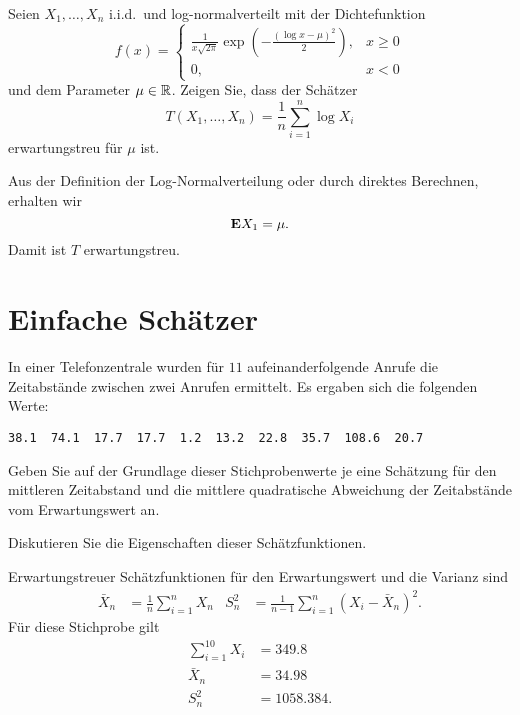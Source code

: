  Seien $X_1,\dots
,X_n$ i.i.d.\ und log-normalverteilt mit der Dichtefunktion
\begin{equation*}
    f(x) = \begin{cases}
        \frac{1}{ x\sqrt{2\pi} } \exp \left( - \frac{ (\log x - \mu)^2 }{ 2 } \right), & x\geq 0 \\
        0, & x<0
    \end{cases}
\end{equation*}
und dem Parameter $\mu\in\mathbb R$. Zeigen Sie, dass der Schätzer 
\begin{equation*}
    T\left( X_1,\dots ,X_n \right) = \frac{1}{n} \sum_{i=1}^{n} \log X_i
\end{equation*}
erwartungstreu für $\mu$ ist. 

\solution Aus der Definition der Log-Normalverteilung oder durch
direktes Berechnen, erhalten wir
\begin{equation*}
    \mathbf E X_1 = \mu.
\end{equation*}
Damit ist $T$ erwartungstreu.


\section{Einfache Schätzer}

 In einer Telefonzentrale wurden für $11$
aufeinanderfolgende Anrufe die Zeitabstände zwischen zwei Anrufen ermittelt. Es
ergaben sich die folgenden Werte:
\begin{lstlisting}
38.1  74.1  17.7  17.7  1.2  13.2  22.8  35.7  108.6  20.7
\end{lstlisting}
Geben Sie auf der Grundlage dieser Stichprobenwerte je eine Schätzung für den
mittleren Zeitabstand und die mittlere quadratische Abweichung der Zeitabstände
vom Erwartungswert an. 

Diskutieren Sie die Eigenschaften dieser Schätzfunktionen.

\solution Erwartungstreuer Schätzfunktionen für den Erwartungswert und
die Varianz sind
\begin{align*}
    \bar X_n &= \frac{1}{n} \sum_{i=1}^{n} X_n & S_n^{2} &= \frac{1}{n-1} \sum_{i=1}^{n} \left( X_i - \bar X_n \right)^{2}. 
\end{align*}
Für diese Stichprobe gilt
\begin{align*}
    \sum_{i=1}^{10} X_i &= 349.8 \\
    \bar X_n &= 34.98 \\
    S^2_n &= 1058.384.
\end{align*}




